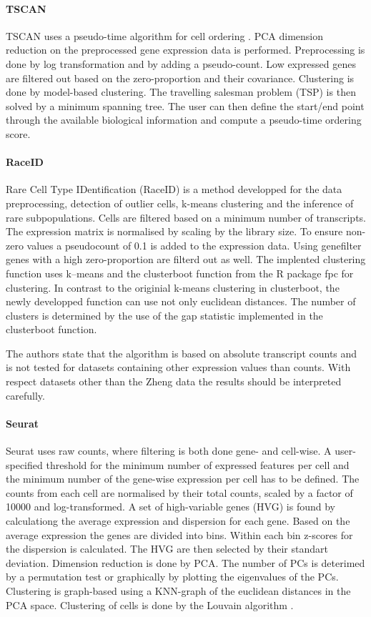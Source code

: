\documentclass[12pt, a4paper]{article}\usepackage[]{graphicx}\usepackage[]{color}
\begin{document}
\paragraph{TSCAN}
TSCAN uses a pseudo-time algorithm for cell ordering \citep{ji2015tscan}. PCA dimension reduction on the preprocessed gene expression data is performed. Preprocessing is done by log transformation and by adding a pseudo-count. Low expressed genes are filtered out based on the zero-proportion and their covariance. Clustering is done by model-based clustering. 
The travelling salesman problem (TSP) is then solved by a minimum spanning tree. The user can then define the start/end point through the available biological information and compute a pseudo-time ordering score. 
\paragraph{RaceID}
Rare Cell Type IDentification (RaceID) is a method developped for the data preprocessing, detection of outlier cells, k-means clustering and the inference of rare subpopulations. Cells are filtered based on a minimum number of transcripts. The expression matrix is normalised by scaling by the library size. To ensure non-zero values a pseudocount of 0.1 is added to the expression data.
Using genefilter genes with a high zero-proportion are filterd out as well.
The implented clustering function uses k--means and the clusterboot function from the R package fpc for clustering. In contrast to the originial k-means clustering in clusterboot, the newly developped function can use not only euclidean distances. 
The number of clusters is determined by the use of the gap statistic implemented in the clusterboot function.

The authors state that the algorithm is based on absolute transcript counts and is not tested for datasets containing other expression values than counts. With respect datasets other than the Zheng data the results should be interpreted carefully.

\paragraph{Seurat}
Seurat uses raw counts, where filtering is both done gene- and cell-wise. A user-specified threshold for the minimum number of expressed features per cell and the minimum number of the gene-wise expression per cell has to be defined. The counts from each cell are normalised by their total counts, scaled by a factor of 10000 and log-transformed. A set of high-variable genes (HVG) is found by calculationg the average expression and dispersion for each gene. Based on the average expression the genes are divided into bins. Within each bin z-scores for the dispersion is calculated. The HVG are then selected by their standart deviation.
Dimension reduction is done by PCA. The number of PCs is deterimed by a permutation test or graphically by plotting the eigenvalues of the PCs. Clustering is graph-based using a KNN-graph of the euclidean distances in the PCA space. Clustering of cells is done by the Louvain algorithm \citep{butler2017integrated}.
\end{document}
